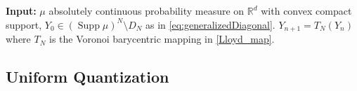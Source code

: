 \documentclass[11pt]{article}
\DeclareMathOperator{\supp}{Supp}
\newcommand{\N}{\mathbb N}
\newcommand{\R}{\mathbb R}
\newcommand{\1}{\mathbbm{1}}
\numberwithin{equation}{section}
\begin{document}
\begin{algorithm}[t]
  \caption{Lloyd's algorithm for optimal quantization}
	\label{alg:LOYD_optimal_quant}
	\begin{algorithmic}
	\STATE \textbf{Input:} $\mu$ absolutely continuous probability measure on $\R^d$ with convex compact support, $Y_0  \in (\supp\mu)^N \setminus D_N$ as in \eqref{eq:generalizedDiagonal}.
    \FOR{$n \in \N$}
        \STATE $Y_{n+1} = T_N(Y_n)$ where $T_N$ is the Voronoi barycentric mapping in \eqref{Lloyd_map}.
    \ENDFOR
 	\end{algorithmic}
\end{algorithm}

\subsection{Uniform Quantization}\label{section_Uniform_Quantization}
\end{document}
